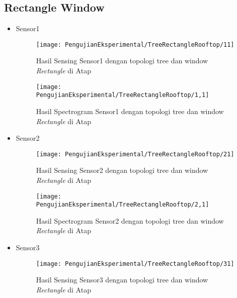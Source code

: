 \subsection{Rectangle Window}
\begin{itemize}
\item Sensor1
\begin{figure}[H]
	\centering
	\texttt{[image: PengujianEksperimental/TreeRectangleRooftop/11]}
	\caption[Hasil Sensing Sensor1 dengan topologi tree dan window {\it Rectangle} di Atap]{Hasil Sensing Sensor1 dengan topologi tree dan window {\it Rectangle} di Atap} 
	\label{fig:hasilAtapTreeRect11}
\end{figure}

\begin{figure}[H]
	\centering
	\texttt{[image: PengujianEksperimental/TreeRectangleRooftop/1,1]}
	\caption[Hasil Spectrogram Sensor1 dengan topologi tree dan window {\it Rectangle} di Atap]{Hasil Spectrogram Sensor1 dengan topologi tree dan window {\it Rectangle} di Atap} 
	\label{fig:hasilAtapTreeRect1,1}
\end{figure}

\item Sensor2
\begin{figure}[H]
	\centering
	\texttt{[image: PengujianEksperimental/TreeRectangleRooftop/21]}
	\caption[Hasil Sensing Sensor2 dengan topologi tree dan window {\it Rectangle} di Atap]{Hasil Sensing Sensor2 dengan topologi tree dan window {\it Rectangle} di Atap} 
	\label{fig:hasilAtapTreeRect21}
\end{figure}

\begin{figure}[H]
	\centering
	\texttt{[image: PengujianEksperimental/TreeRectangleRooftop/2,1]}
	\caption[Hasil Spectrogram Sensor2 dengan topologi tree dan window {\it Rectangle} di Atap]{Hasil Spectrogram Sensor2 dengan topologi tree dan window {\it Rectangle} di Atap} 
	\label{fig:hasilAtapTreeRect2,1}
\end{figure}

\item Sensor3
\begin{figure}[H]
	\centering
	\texttt{[image: PengujianEksperimental/TreeRectangleRooftop/31]}
	\caption[Hasil Sensing Sensor3 dengan topologi tree dan window {\it Rectangle} di Atap]{Hasil Sensing Sensor3 dengan topologi tree dan window {\it Rectangle} di Atap} 
	\label{fig:hasilAtapTreeRect31}
\end{figure}


\end{itemize}
